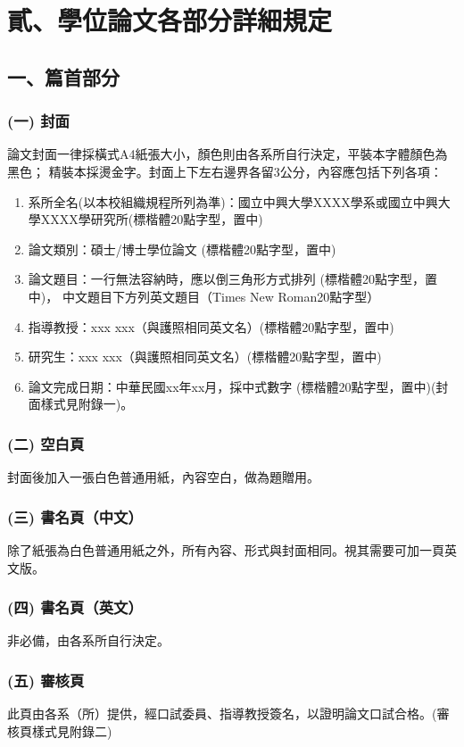 \chapter{貳、學位論文各部分詳細規定}
\section{一、篇首部分}
\subsection{(一) 封面}
論文封面一律採橫式A4紙張大小，顏色則由各系所自行決定，平裝本字體顏色為黑色；
精裝本採燙金字。封面上下左右邊界各留3公分，內容應包括下列各項：
\begin{enumerate}
    \item 系所全名(以本校組織規程所列為準)：國立中興大學XXXX學系或國立中興大學XXXX學研究所(標楷體20點字型，置中)
    \item 論文類別：碩士/博士學位論文 (標楷體20點字型，置中)
    \item 論文題目：一行無法容納時，應以倒三角形方式排列 (標楷體20點字型，置中)，
           中文題目下方列英文題目（Times New Roman20點字型）
    \item 指導教授：xxx  xxx（與護照相同英文名）(標楷體20點字型，置中)
    \item 研究生：xxx xxx（與護照相同英文名）(標楷體20點字型，置中)
    \item 論文完成日期：中華民國xx年xx月，採中式數字 (標楷體20點字型，置中)(封面樣式見附錄一)。
\end{enumerate}

\subsection{(二) 空白頁}
封面後加入一張白色普通用紙，內容空白，做為題贈用。

\subsection{(三) 書名頁（中文）}
除了紙張為白色普通用紙之外，所有內容、形式與封面相同。視其需要可加一頁英文版。

\subsection{(四) 書名頁（英文）}
非必備，由各系所自行決定。

\subsection{(五) 審核頁}
此頁由各系（所）提供，經口試委員、指導教授簽名，以證明論文口試合格。(審核頁樣式見附錄二)

